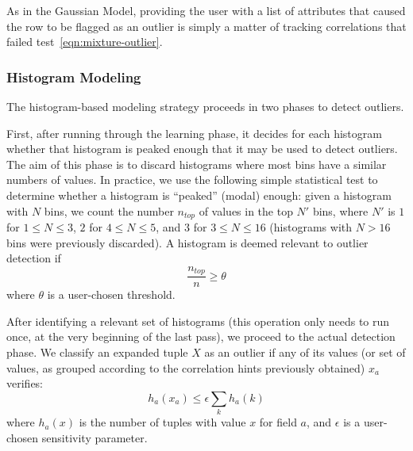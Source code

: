 As in the Gaussian Model, providing the user with a list of attributes that caused the row to be flagged as an outlier is simply a matter of tracking correlations that failed test~\ref{eqn:mixture-outlier}.

\subsubsection{Histogram Modeling}
The histogram-based modeling strategy proceeds in two phases to detect outliers. 

First, after running through the learning phase, it decides for each histogram whether that histogram is peaked enough that it may be used to detect outliers. The aim of this phase is to discard histograms where most bins have a similar numbers of values. In practice, we use the following simple statistical test to determine whether a histogram is ``peaked'' (modal) enough: given a histogram with $N$ bins, we count the number $n_{top}$ of values in the top $N'$ bins, where $N'$ is $1$ for $1 \leq N \leq 3$, $2$ for $4 \leq N \leq 5$, and $3$ for $3 \leq N \leq 16$ (histograms with $N > 16$ bins were previously discarded). A histogram is deemed relevant to outlier detection if
\begin{equation}
 \frac{n_{top}}{n} \geq \theta 
\end{equation}
where $\theta$ is a user-chosen threshold. 

After identifying a relevant set of histograms (this operation only needs to run once, at the very beginning of the last pass), we proceed to the actual detection phase. We classify an expanded tuple $X$ as an outlier if any of its values (or set of values, as grouped according to the correlation hints previously obtained) $x_a$ verifies:
\begin{equation}
h_a(x_a) \le \epsilon \sum_k h_a(k)
\end{equation}
where $h_a(x)$ is the number of tuples with value $x$ for field $a$, and $\epsilon$ is a user-chosen sensitivity parameter.

